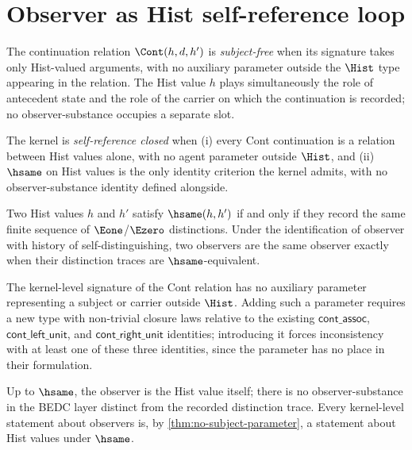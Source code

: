 \section{Observer as Hist self-reference loop}
\label{sec:observer-as-self-reference}

\begin{definition}
\label{def:subject-free-observation}
The continuation relation \(\Cont(h, d, h')\) is \emph{subject-free} when its signature takes only Hist-valued arguments, with no auxiliary parameter outside the \(\Hist\) type appearing in the relation. The Hist value \(h\) plays simultaneously the role of antecedent state and the role of the carrier on which the continuation is recorded; no observer-substance occupies a separate slot.
\end{definition}
\begin{definition}
\label{def:self-reference-closure}
The kernel is \emph{self-reference closed} when (i) every Cont continuation is a relation between Hist values alone, with no agent parameter outside \(\Hist\), and (ii) \(\hsame\) on Hist values is the only identity criterion the kernel admits, with no observer-substance identity defined alongside.
\end{definition}
\begin{theorem}
\label{thm:hsame-observer-identity}
Two Hist values \(h\) and \(h'\) satisfy \(\hsame(h, h')\) if and only if they record the same finite sequence of \(\Eone\)/\(\Ezero\) distinctions. Under the identification of observer with history of self-distinguishing, two observers are the same observer exactly when their distinction traces are \(\hsame\)-equivalent.
\end{theorem}
\begin{theorem}
\label{thm:no-subject-parameter}
The kernel-level signature of the Cont relation has no auxiliary parameter representing a subject or carrier outside \(\Hist\). Adding such a parameter requires a new type with non-trivial closure laws relative to the existing \(\mathsf{cont\_assoc}\), \(\mathsf{cont\_left\_unit}\), and \(\mathsf{cont\_right\_unit}\) identities; introducing it forces inconsistency with at least one of these three identities, since the parameter has no place in their formulation.
\end{theorem}
\begin{corollary}
\label{cor:observer-is-hist}
Up to \(\hsame\), the observer is the Hist value itself; there is no observer-substance in the BEDC layer distinct from the recorded distinction trace. Every kernel-level statement about observers is, by \autoref{thm:no-subject-parameter}, a statement about Hist values under \(\hsame\).
\end{corollary}
